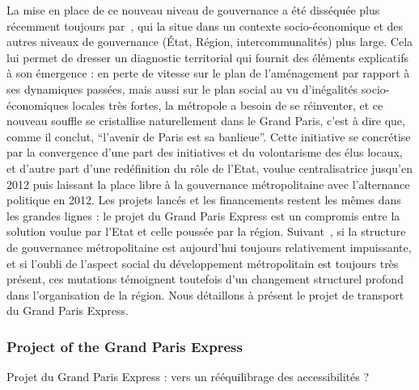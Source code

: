 La mise en place de ce nouveau niveau de gouvernance a été disséquée plus récemment toujours par~\cite{gilli2014gouverner}, qui la situe dans un contexte socio-économique et des autres niveaux de gouvernance (État, Région, intercommunalités) plus large. Cela lui permet de dresser un diagnostic territorial qui fournit des éléments explicatifs à son émergence : en perte de vitesse sur le plan de l'aménagement par rapport à ses dynamiques passées, mais aussi sur le plan social au vu d'inégalités socio-économiques locales très fortes, la métropole a besoin de se réinventer, et ce nouveau souffle se cristallise naturellement dans le Grand Paris, c'est à dire que, comme il conclut, ``l'avenir de Paris est sa banlieue''. Cette initiative se concrétise par la convergence d'une part des initiatives et du volontarisme des élus locaux, et d'autre part d'une redéfinition du rôle de l'Etat, voulue centralisatrice jusqu'en 2012 puis laissant la place libre à la gouvernance métropolitaine avec l'alternance politique en 2012. Les projets lancés et les financements restent les mêmes dans les grandes lignes : le projet du Grand Paris Express est un compromis entre la solution voulue par l'Etat et celle poussée par la région. Suivant~\cite{desjardins2016grand}, si la structure de gouvernance métropolitaine est aujourd'hui toujours relativement impuissante, et si l'oubli de l'aspect social du développement métropolitain est toujours très présent, ces mutations témoignent toutefois d'un changement structurel profond dans l'organisation de la région. Nous détaillons à présent le projet de transport du Grand Paris Express.







\subsubsection{Project of the Grand Paris Express}{Projet du Grand Paris Express : vers un rééquilibrage des accessibilités ?}






